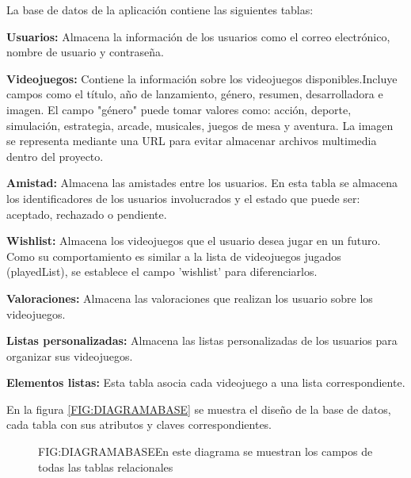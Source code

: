 La base de datos de la aplicación contiene las siguientes tablas: 
\begin{description}
    \item \textbf{Usuarios: } Almacena la información de los usuarios como el correo electrónico,
    nombre de usuario y contraseña.
    \item \textbf{Videojuegos: } Contiene la información sobre los videojuegos disponibles.Incluye campos como el título, 
    año de lanzamiento, género, resumen, desarrolladora e imagen. El campo "género" puede tomar valores como: acción, deporte, 
    simulación, estrategia, arcade, musicales, juegos de mesa y aventura. La imagen se representa mediante una URL para 
    evitar almacenar archivos multimedia dentro del proyecto.
    \item \textbf{Amistad: } Almacena las amistades entre los usuarios. En esta tabla se almacena los identificadores de los usuarios 
    involucrados y el estado que puede ser: aceptado, rechazado o pendiente. 
    \item \textbf{Wishlist: } Almacena los videojuegos que el usuario desea jugar en un futuro. Como su comportamiento es similar a la 
    lista de videojuegos jugados (playedList), se establece el campo 'wishlist' para diferenciarlos.
    \item \textbf{Valoraciones: }Almacena las valoraciones que realizan los usuario sobre los videojuegos.
    \item \textbf{Listas personalizadas: } Almacena las listas personalizadas de los usuarios para organizar sus videojuegos.
    \item \textbf{Elementos listas: } Esta tabla asocia cada videojuego a una lista correspondiente.
\end{description}

En la figura \ref{FIG:DIAGRAMABASE} se muestra el diseño de la base de datos, cada tabla con sus atributos y claves 
correspondientes. 

\begin{figure}[Diagrama de base de datos]{FIG:DIAGRAMABASE}{En este diagrama se muestran los campos de todas las tablas relacionales }
\end{figure}